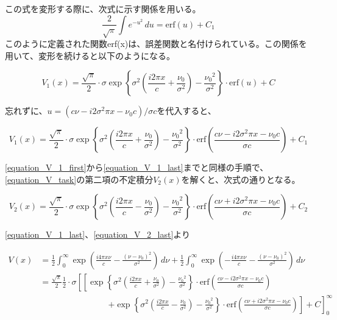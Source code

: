 \documentclass[uplatex, titlepage, fontsize=10pt, paper=a4paper]{jsarticle}
\numberwithin{equation}{section}
\begin{document}
この式を変形する際に、次式に示す関係を用いる。
\begin{equation}
    \frac{2}{\sqrt{\pi}}\int e^{-u^2} \,du = \mathrm{erf}(u) + C_1
\end{equation}
このように定義された関数erf(x)は、誤差関数と名付けられている。この関係を用いて、変形を続けると以下のようになる。

\begin{equation}
    V_1(x)=\frac{\sqrt{\pi}}{2}\cdot \sigma\exp\left\{\sigma^2\left(\frac{i2{\pi}x}{c}+\frac{\nu_0}{\sigma^2}\right)-\frac{{\nu_0}^2}{\sigma^2}\right\} \cdot \mathrm{erf}(u) + C
\end{equation}

忘れずに、$u=(c\nu-i2{\sigma^2}{\pi}x-{\nu_0}c)/{\sigma}c$を代入すると、

\begin{equation}
    V_1(x)=\frac{\sqrt{\pi}}{2}\cdot \sigma\exp\left\{\sigma^2\left(\frac{i2{\pi}x}{c}+\frac{\nu_0}{\sigma^2}\right)-\frac{{\nu_0}^2}{\sigma^2}\right\} \cdot \mathrm{erf}\left(\frac{c\nu-i2{\sigma^2}{\pi}x-{\nu_0}c}{{\sigma}c}\right) + C_1
    \label{equation_V_1_last}
\end{equation}

\eqref{equation_V_1_first}から\eqref{equation_V_1_last}までと同様の手順で、\eqref{equation_V_task}の第二項の不定積分$V_2(x)$を解くと、次式の通りとなる。

\begin{equation}
    V_2(x)=\frac{\sqrt{\pi}}{2}\cdot \sigma\exp\left\{\sigma^2\left(\frac{i2{\pi}x}{c}-\frac{\nu_0}{\sigma^2}\right)-\frac{{\nu_0}^2}{\sigma^2}\right\} \cdot \mathrm{erf}\left(\frac{c\nu+i2{\sigma^2}{\pi}x-{\nu_0}c}{{\sigma}c}\right) + C_2
    \label{equation_V_2_last}
\end{equation}

\eqref{equation_V_1_last}、\eqref{equation_V_2_last}より

\begin{equation}
    \begin{split}
        V(x)&=\frac{1}{2}\int_{0}^{\infty} \exp\left(\frac{i4{\pi}x{\nu}}{c}-\frac{(\nu-\nu_0)^2}{\sigma^2}\right) \,d\nu + \frac{1}{2}\int_{0}^{\infty} \exp\left(-\frac{i4{\pi}x{\nu}}{c}-\frac{(\nu-\nu_0)^2}{\sigma^2}\right) \,d\nu \\
        &=\frac{\sqrt{\pi}}{2} \frac{1}{2}\cdot\sigma\left[\left[\exp\left\{\sigma^2\left(\frac{i2{\pi}x}{c}+\frac{\nu_0}{\sigma^2}\right)-\frac{{\nu_0}^2}{\sigma^2}\right\} \cdot \mathrm{erf}\left(\frac{c\nu-i2{\sigma^2}{\pi}x-{\nu_0}c}{{\sigma}c}\right) \right.\right.\\
        &\qquad\qquad\qquad\qquad\left.\left. + \exp\left\{\sigma^2\left(\frac{i2{\pi}x}{c}-\frac{\nu_0}{\sigma^2}\right)-\frac{{\nu_0}^2}{\sigma^2}\right\} \cdot \mathrm{erf}\left(\frac{c\nu+i2{\sigma^2}{\pi}x-{\nu_0}c}{{\sigma}c}\right)\right]+C\right]_{0}^{\infty}
    \end{split}
\end{equation}
\end{document}
